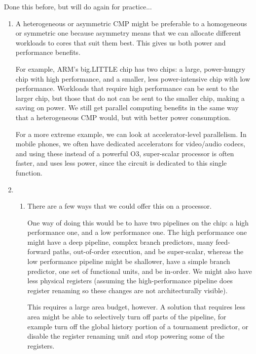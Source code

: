 


Done this before, but will do again for practice...
\begin{enumerate}[label=(\alph*)]
    \item
        A heterogeneous or asymmetric CMP might be preferable to a homogeneous or symmetric one because asymmetry means that we can allocate different workloads to cores that suit them best. This gives us both power and performance benefits.

        For example, ARM's big.LITTLE chip has two chips: a large, power-hungry chip with high performance, and a smaller, less power-intensive chip with low performance. Workloads that require high performance can be sent to the larger chip, but those that do not can be sent to the smaller chip, making a saving on power. We still get parallel computing benefits in the same way that a heterogeneous CMP would, but with better power consumption.

        For a more extreme example, we can look at accelerator-level parallelism. In mobile phones, we often have dedicated accelerators for video/audio codecs, and using these instead of a powerful O3, super-scalar processor is often faster, and uses less power, since the circuit is dedicated to this single function.

    \item
        \begin{enumerate}[label=(\roman*)]
            \item
                There are a few ways that we could offer this on a processor.

                One way of doing this would be to have two pipelines on the chip: a high performance one, and a low performance one. The high performance one might have a deep pipeline, complex branch predictors, many feed-forward paths, out-of-order execution, and be super-scalar, whereas the low performance pipeline might be shallower, have a simple branch predictor, one set of functional units, and be in-order. We might also have less physical registers (assuming the high-performance pipeline does register renaming so these changes are not architecturally visible).

                This requires a large area budget, however. A solution that requires less area might be able to selectively turn off parts of the pipeline, for example turn off the global history portion of a tournament predictor, or disable the register renaming unit and stop powering some of the registers.


\end{enumerate}
\end{enumerate}
